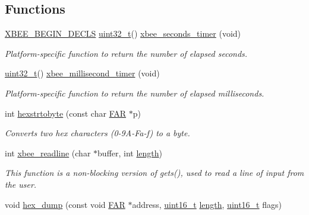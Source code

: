 \subsection*{Functions}
\begin{DoxyCompactItemize}
\item 
\hyperlink{group__hal_ga336bff4f4a6012aacc4468132bbd3d7f}{X\-B\-E\-E\-\_\-\-B\-E\-G\-I\-N\-\_\-\-D\-E\-C\-L\-S} \hyperlink{group__hal__dos_ga09a1e304d66d35dd47daffee9731edaa}{uint32\-\_\-t}() \hyperlink{group__hal_ga5c1a8bccd41acf1d7264a75698077749}{xbee\-\_\-seconds\-\_\-timer} (void)
\begin{DoxyCompactList}\small\item\em Platform-\/specific function to return the number of elapsed seconds. \end{DoxyCompactList}\item 
\hyperlink{group__hal__dos_ga09a1e304d66d35dd47daffee9731edaa}{uint32\-\_\-t}() \hyperlink{group__hal_ga22b4e3df788254ca5f8530e9aee58515}{xbee\-\_\-millisecond\-\_\-timer} (void)
\begin{DoxyCompactList}\small\item\em Platform-\/specific function to return the number of elapsed milliseconds. \end{DoxyCompactList}\item 
int \hyperlink{group__hal_ga519e5ae2049b59689a474a8c48fee353}{hexstrtobyte} (const char \hyperlink{group__hal_gaef060b3456fdcc093a7210a762d5f2ed}{F\-A\-R} $\ast$p)
\begin{DoxyCompactList}\small\item\em Converts two hex characters (0-\/9\-A-\/\-Fa-\/f) to a byte. \end{DoxyCompactList}\item 
int \hyperlink{group__hal_ga8c0c80b64f63d395e718172190b21fcc}{xbee\-\_\-readline} (char $\ast$buffer, int \hyperlink{group__zdo_gab2b3adeb2a67e656ff030b56727fd0ac}{length})
\begin{DoxyCompactList}\small\item\em This function is a non-\/blocking version of gets(), used to read a line of input from the user. \end{DoxyCompactList}\item 
void \hyperlink{group__hal_gaa321236a0cb6f4e0dad592fdf1b550d2}{hex\-\_\-dump} (const void \hyperlink{group__hal_gaef060b3456fdcc093a7210a762d5f2ed}{F\-A\-R} $\ast$address, \hyperlink{group__hal_ga5a8b2dc9e45a9ee81a94ef304fb62505}{uint16\-\_\-t} \hyperlink{group__zdo_gab2b3adeb2a67e656ff030b56727fd0ac}{length}, \hyperlink{group__hal_ga5a8b2dc9e45a9ee81a94ef304fb62505}{uint16\-\_\-t} flags)

\end{DoxyCompactItemize}
